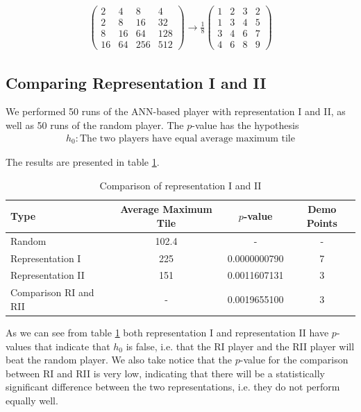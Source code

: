 \documentclass[11pt,a4paper]{article}
\begin{document}
\begin{align*}
\begin{pmatrix}
  2  &  4 &   8 &  4\\
  2  &  8 &  16 & 32 \\
  8  & 16 &  64 & 128 \\
  16 & 64 & 256 & 512
\end{pmatrix}
\rightarrow
\frac{1}{8}
\begin{pmatrix}
  1 & 2 & 3 & 2 \\
  1 & 3 & 4 & 5 \\
  3 & 4 & 6 & 7 \\
  4 & 6 & 8 & 9
\end{pmatrix}
\end{align*}

\subsection*{Comparing Representation I and II}
We performed 50 runs of the ANN-based player with representation I and II, as well as 50 runs of the random player. The $p$-value has the hypothesis
\begin{align}
h_0: \textrm{The two players have equal average maximum tile}
\end{align}

The results are presented in table \ref{tab:comparisonRepIandII}.

\begin{table}[h!]
\centering
\caption{Comparison of representation I and II}
\begin{tabular}{lccc}
Type & Average Maximum Tile & $p$-value & Demo Points\\
\hline
Random & 102.4 & - & - \\
Representation I & 225 & 0.0000000790 & 7 \\
Representation II & 151 & 0.0011607131 & 3\\
\hline
Comparison RI and RII & - & 0.0019655100 & 3
\end{tabular}
\label{tab:comparisonRepIandII}
\end{table}

As we can see from table \ref{tab:comparisonRepIandII} both representation I and representation II have $p$-values that indicate that $h_0$ is false, i.e. that the RI player and the RII player will beat the random player. We also take notice that the $p$-value for the comparison between RI and RII is very low, indicating that there will be a statistically significant difference between the two representations, i.e. they do not perform equally well. 
\end{document}
